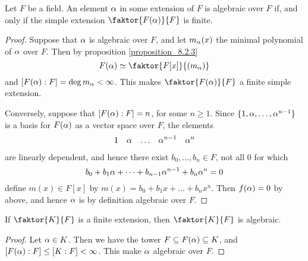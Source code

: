 \begin{proposition}\label{proposition_8.4.2}
  Let $F$ be a field. An element $\alpha$ in some extension of $F$ is
  algebraic over $F$ if, and only if the simple extension
  $\faktor{F(\a)}{F}$ is finite.
\end{proposition}
\begin{proof}
  Suppose that $\alpha$ is algebraic over $F$, and let $m_\alpha(x)$ the
  minimal polynomial of $\alpha$ over $F$. Then by proposition
  \ref{proposition_8.2.3}
  \begin{equation*}
    F(\a) \simeq \faktor{F[x]}{(m_\a)}
  \end{equation*}
  and $[F(\alpha):F]=\deg{m_\alpha}<\infty$. This makes $\faktor{F(\a)}{F}$ a
  finite simple extension.

  Conversely, suppose that $[F(\alpha):F]=n$, for some $n \geq 1$. Since
  $\{ 1, \alpha, \dots, \alpha^{n-1} \}$ is a basis for $F(\alpha)$ as a vector
  space over $F$, the elements
  \begin{align*}
    1 &&  \alpha  &&  \dots &&  \alpha^{n-1}  &&  \alpha^n  \\
  \end{align*}
  are linearly dependent, and hence there exist $b_0, \dots, b_n \in
  F$, not all $0$ for which
  \begin{equation*}
    b_0+b_1\alpha+\dots+b_{n-1}\alpha^{n-1}+b_n\alpha^n=0
  \end{equation*}
  define $m(x) \in F[x]$ by $m(x)=b_0+b_1x+\dots+b_nx^n$. Then
  $f(\alpha)=0$ by above, and hence $\alpha$ is by definition algebraic over
  $F$.
\end{proof}
\begin{corollary}
  If $\faktor{K}{F}$ is a finite extension, then $\faktor{K}{F}$ is
  algebraic.
\end{corollary}
\begin{proof}
  Let $\alpha \in K$. Then we have the tower $F \subseteq F(\alpha) \subseteq
  K$, and $[F(\alpha):F] \leq [K:F]<\infty$. This make $\alpha$ algebraic over
  $F$.
\end{proof}

